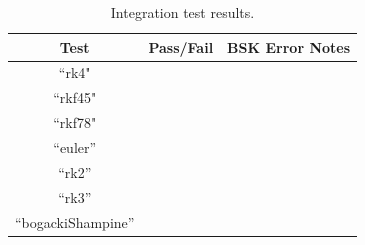 \begin{table}[h]
	\caption{Integration test results.}
	\label{tbl:intResults}
	\centering \fontsize{10}{10}\selectfont
	\begin{tabular}{c | c | p{4in} } %
		\hline\hline
		\textbf{Test} 			& \textbf{Pass/Fail} 	 & \textbf{BSK Error Notes}
		\\ \hline
		``rk4"		  	&
		      	  &
		
		\\ \hline
		``rkf45"		  	&
		      	  &
		
		\\ \hline
		``rkf78"		  	&
		      	  &
		
		\\ \hline
		``euler''	   	           	&
		           		&      
		  
		\\ \hline
		``rk2''      	&
		
		&
		
		\\ \hline
		``rk3''      	&
		
		&
		
		\\ \hline
		``bogackiShampine''      	&
		
		&
		
		\\
		\hline\hline
	\end{tabular}
\end{table}
